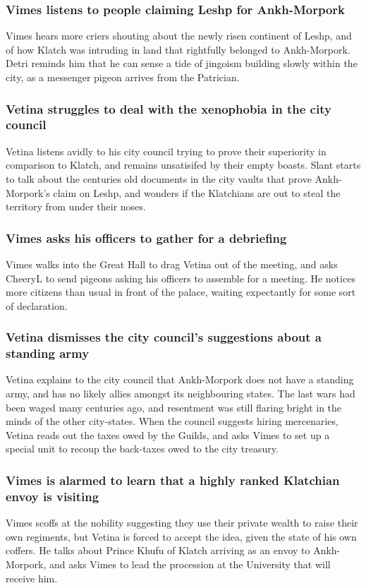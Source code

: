 \subsubsection{\Gls{Vimes} listens to people claiming Leshp for Ankh-Morpork}
\Gls{Vimes} hears more criers shouting about the newly risen continent of Leshp, and of how Klatch
was intruding in land that rightfully belonged to Ankh-Morpork. \Gls{Detri} reminds him that he can
sense a tide of jingoism building slowly within the city, as a messenger pigeon arrives from the
Patrician.

\subsubsection{\Gls{Vetina} struggles to deal with the xenophobia in the city council}
\Gls{Vetina} listens avidly to his city council trying to prove their superiority in comparison
to Klatch, and remains unsatisifed by their empty boasts. \Gls{Slant} starts to talk about the
centuries old documents in the city vaults that prove Ankh-Morpork's claim on Leshp, and wonders
if the Klatchians are out to steal the territory from under their noses.

\subsubsection{\Gls{Vimes} asks his officers to gather for a debriefing}
\Gls{Vimes} walks into the Great Hall to drag \Gls{Vetina} out of the meeting, and asks
\Gls{CheeryL} to send pigeons asking his officers to assemble for a meeting. He notices more
citizens than usual in front of the palace, waiting expectantly for some sort of declaration.

\subsubsection{\Gls{Vetina} dismisses the city council's suggestions about a standing army}
\Gls{Vetina} explains to the city council that Ankh-Morpork does not have a standing army, and
has no likely allies amongst its neighbouring states. The last wars had been waged many centuries
ago, and resentment was still flaring bright in the minds of the other city-states. When the
council suggests hiring mercenaries, \Gls{Vetina} reads out the taxes owed by the Guilds, and asks
\Gls{Vimes} to set up a special unit to recoup the back-taxes owed to the city treasury.

\subsubsection{\Gls{Vimes} is alarmed to learn that a highly ranked Klatchian envoy is visiting}
\Gls{Vimes} scoffs at the nobility suggesting they use their private wealth to raise their own
regiments, but \Gls{Vetina} is forced to accept the idea, given the state of his own coffers. He
talks about Prince \Gls{Khufu} of Klatch arriving as an envoy to Ankh-Morpork, and asks \Gls{Vimes}
to lead the procession at the University that will receive him.


